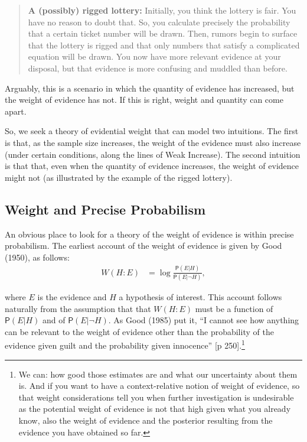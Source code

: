 \documentclass[
  10pt,
  dvipsnames,enabledeprecatedfontcommands]{scrartcl}
\newcommand{\pr}[1]{\mathsf{P}(#1)}
\begin{document}
\begin{quote}
\textbf{A (possibly) rigged lottery:} Initially, you think the lottery  is  fair. You have no reason to doubt that. So, you calculate precisely the probability that a certain ticket number will be drawn. Then, rumors begin to surface that the lottery is rigged and that only numbers that satisfy a complicated equation will be drawn. You now have more relevant evidence at your disposal, but that evidence is more confusing and muddled than before. 
\end{quote}

\noindent Arguably, this is a scenario in which the quantity of evidence
has increased, but the weight of evidence has not. If this is right,
weight and quantity can come apart.

So, we seek a theory of evidential weight that can model two intuitions.
The first is that, as the sample size increases, the weight of the
evidence must also increase (under certain conditions, along the lines
of Weak Increase). The second intuition is that that, even when the
quantity of evidence increases, the weight of evidence might not (as
illustrated by the example of the rigged lottery).

\hypertarget{weight-and-precise-probabilism}{%
\subsection{Weight and Precise
Probabilism}\label{weight-and-precise-probabilism}}

An obvious place to look for a theory of the weight of evidence is
within precise probabilism. The earliest account of the weight of
evidence is given by Good (1950), as follows: \begin{align*}
W(H:E) & = \log \frac{\pr{E \vert H}}{\pr{E\vert \neg H}},
\end{align*}

\noindent where \(E\) is the evidence and \(H\) a hypothesis of
interest. This account follows naturally from the assumption that that
\(W(H:E)\) must be a function of \(\pr{E\vert H}\) and of
\(\pr{E\vert \neg H}\). As Good (1985) put it, ``I cannot see how
anything can be relevant to the weight of evidence other than the
probability of the evidence given guilt and the probability given
innocence'' {[}p
250{]}.\footnote{We can: how good those estimates are and what our uncertainty about them is. And if you want to have a context-relative notion of weight of evidence, so that weight considerations tell you when further investigation is undesirable as the potential weight of evidence is not that high given what you already know, also the weight of evidence and the posterior resulting from   the evidence you have obtained so far.}
\end{document}
